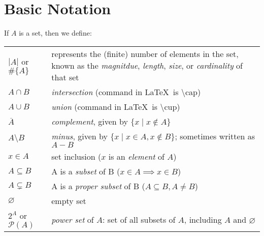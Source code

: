 \label{02-0129}






% 




\section{Basic Notation}
If $A$ is a set, then we define:

\begin{tabular}{p{1in} p{10cm}}
    $|A|$ or $\#\{A\}$ &  represents the (finite) number of elements in the set, known as the \emph{magnitdue}, \emph{length}, \emph{size}, or \emph{cardinality} of that set\\
    $A \cap B$ & \emph{intersection} (command in \LaTeX\ is \textbackslash cap) \\
    $A \cup B$ & \emph{union} (command in \LaTeX\ is \textbackslash cup) \\
    $\overline{A}$ & \emph{complement}, given by $\{x \mid x \not\in A\}$ \\
    $A \setminus B$ & \emph{minus}, given by $\{x \mid x \in A, x \not\in B\}$; sometimes written as $A-B$ \\
    $x\in A$ & set inclusion ($x$ is an \emph{element} of $A$) \\
    $A \subseteq B$ & A is a \emph{subset} of B ($x\in A \implies x \in B$) \\
    $A \subsetneq B$ & A is a \emph{proper subset} of B ($A\subseteq B, A\neq B$) \\
    $\varnothing$ & empty set \\
    $2^A$ or $\mathcal{P}(A)$ & \emph{power set} of $A$: set of all subsets of $A$, including $A$ and $\varnothing$
\end{tabular}

